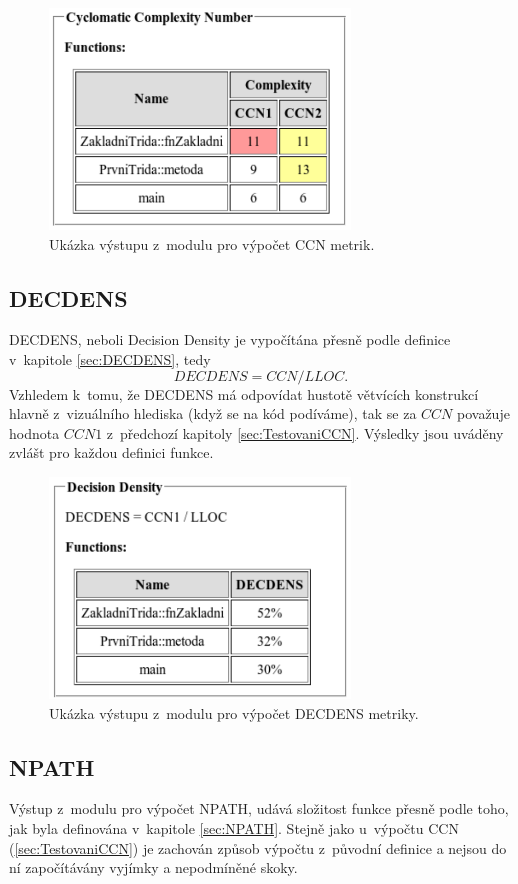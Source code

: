 \documentclass[11pt,twoside,a4paper]{book}
\begin{document}
\begin{figure}[H]
\begin{center}
\includegraphics[width=8cm]{figures/output_ccn.pdf}
\caption{Ukázka výstupu z~modulu pro výpočet CCN metrik.}
\label{fig:out_ccn}
\end{center}
\end{figure}

\subsection{DECDENS}
DECDENS, neboli Decision Density je vypočítána přesně podle definice v~kapitole \ref{sec:DECDENS}, tedy
$$DECDENS = CCN / LLOC.$$
Vzhledem k~tomu, že DECDENS má odpovídat hustotě větvících konstrukcí hlavně z~vizuálního hlediska (když se na kód podíváme),
tak se za $CCN$ považuje hodnota $CCN1$ z~předchozí kapitoly \ref{sec:TestovaniCCN}.
Výsledky jsou uváděny zvlášt pro každou definici funkce.

\begin{figure}[H]
\begin{center}
\includegraphics[width=8cm]{figures/output_decdens.pdf}
\caption{Ukázka výstupu z~modulu pro výpočet DECDENS metriky.}
\label{fig:out_decdens}
\end{center}
\end{figure}

\subsection{NPATH}
Výstup z~modulu pro výpočet NPATH, udává složitost funkce přesně podle toho, jak byla definována v~kapitole \ref{sec:NPATH}.
Stejně jako u~výpočtu CCN (\ref{sec:TestovaniCCN}) je zachován způsob výpočtu z~původní definice a nejsou do ní započítávány vyjímky a nepodmíněné skoky.
\end{document}
